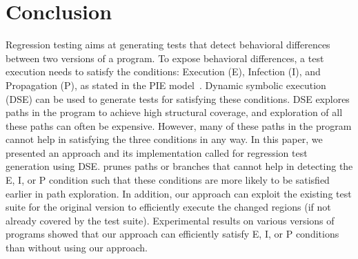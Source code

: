 
\section{Conclusion}
\label{sec:conclusion}
Regression testing aims at generating tests that detect behavioral differences between two versions of a program. To expose behavioral differences, a test execution needs to satisfy the conditions: Execution (E), Infection (I), and Propagation (P), as stated in the PIE model~\cite{voas}. Dynamic symbolic execution (DSE) can be used to generate tests for satisfying these conditions. DSE explores paths in the program to achieve high structural coverage, and exploration of all these paths can often be expensive. However, many of these paths in the program cannot help in satisfying the three conditions in any way. In this paper, we presented an approach and its implementation called  for regression test generation using DSE.  prunes paths or branches that cannot help in detecting the E, I, or P condition such that these conditions are more likely to be satisfied earlier in path exploration. In addition, our approach can exploit the existing test suite for the original version to efficiently execute the changed regions (if not already covered by the test suite). 
Experimental results on various versions of programs showed that our approach can efficiently satisfy E, I, or P conditions than without using our approach. 
